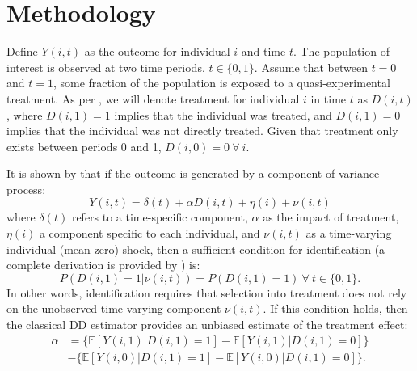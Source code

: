 \nocite{AngelucciDeGiorgi2009} \nocite{Heckmanetal1998}
\nocite{MiguelKremer2004}
 \nocite{Heckmanetal1998b}

\section{Methodology}
Define $Y(i,t)$ as the outcome for individual $i$ and time $t$.  The population
of interest is observed at two time periods, $t\in \{0,1\}$. Assume that between
$t=0$ and $t=1$, some fraction of the population is exposed to a 
quasi-experimental treatment.  As per \citet{Abadie2005}, we will denote 
treatment for individual $i$ in time $t$ as $D(i,t)$, where $D(i,1)=1$ implies 
that the individual was treated, and $D(i,1)=0$ implies that the individual was
not directly treated.  Given that treatment only exists between periods 0 and 1,
$D(i,0)=0\ \forall\ i$.

It is shown by \citet{AshenfelterCard1985} that if the outcome is generated by
a component of variance process:
\begin{equation}
\label{Seqn:COV}
Y(i,t)=\delta(t) + \alpha D(i,t)+\eta(i)+\nu(i,t)
\end{equation}
where $\delta(t)$ refers to a time-specific component, $\alpha$ as the impact of 
treatment, $\eta(i)$ a component specific to each individual, and $\nu(i,t)$ as 
a time-varying individual (mean zero) shock, then a sufficient condition for 
identification (a complete derivation is provided by \citet{Abadie2005}) is:
\begin{equation}
\label{Seqn:ID}
P(D(i,1)=1|\nu(i,t))=P(D(i,1)=1) \ \forall\ t\in\{0,1\}.
\end{equation}
In other words, identification requires that selection into treatment does not
rely on the unobserved time-varying component $\nu(i,t)$.  If this condition 
holds, then the classical DD estimator provides an unbiased estimate of the
treatment effect:
\begin{equation}
\label{Seqn:DD}
\begin{split}
\alpha&=\{\mathbb{E}[Y(i,1)|D(i,1)=1]-\mathbb{E}[Y(i,1)|D(i,1)=0]\} \\
      &-\{\mathbb{E}[Y(i,0)|D(i,1)=1]-\mathbb{E}[Y(i,0)|D(i,1)=0]\}.
\end{split}
\end{equation}

